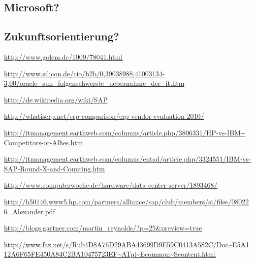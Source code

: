 \documentclass[a4paper,10pt,left=1.5cm,right=1.5cm,top=1.5cm,bottom=1.5cm]{article}
\begin{document}
\subsection*{Microsoft?}
\subsection*{Zukunftsorientierung?}

\begin{thebibliography}{5}
  \newblock \url{http://www.golem.de/1009/78041.html}

  \newblock \url{http://www.silicon.de/cio/b2b/0,39038988,41003134-3,00/oracle_sun_folgenschwerste_uebernahme_der_it.htm}

  \newblock \url{http://de.wikipedia.org/wiki/SAP}

  \newblock \url{http://whatiserp.net/erp-comparison/erp-vendor-evaluation-2010/}

  \newblock \url{http://itmanagement.earthweb.com/columns/article.php/3806331/HP-vs-IBM--Competitors-or-Allies.htm}

  \newblock \url{http://itmanagement.earthweb.com/columns/entad/article.php/3324551/IBM-vs-SAP-Round-X-and-Counting.htm}

  \newblock \url{http://www.computerwoche.de/hardware/data-center-server/1893468/}

  \newblock \url{http://h50146.www5.hp.com/partners/alliance/sap/club/members/si/files/080226_Alexander.pdf}

  \newblock \url{http://blogs.gartner.com/martin_reynolds/?p=25&preview=true}

  \newblock \url{http://www.faz.net/s/Rub4D8A76D29ABA43699D9E59C0413A582C/Doc~E5A112A6F65FE450A84C2BA10475723EF~ATpl~Ecommon~Scontent.html}
\end{thebibliography}
\end{document}
